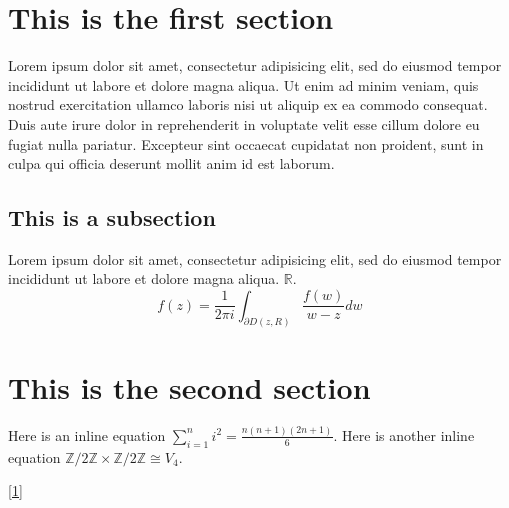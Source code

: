 \documentclass{article}
\newcommand{\Re}{\mathbb{R}}
\begin{document}
\section{This is the first section}

Lorem ipsum dolor sit amet, consectetur adipisicing elit, sed do eiusmod tempor incididunt ut labore et dolore magna aliqua. Ut enim ad minim veniam, quis nostrud exercitation ullamco laboris nisi ut aliquip ex ea commodo consequat. Duis aute irure dolor in reprehenderit in voluptate velit esse cillum dolore eu fugiat nulla pariatur. Excepteur sint occaecat cupidatat non proident, sunt in culpa qui officia deserunt mollit anim id est laborum.

\subsection{This is a subsection}

Lorem ipsum dolor sit amet, consectetur adipisicing elit, sed do eiusmod tempor incididunt ut labore et dolore magna aliqua. $\Re$.
\begin{equation}\tag{1}
  f(z) = \frac{1}{2\pi i} \int_{\partial D(z, R)} \frac{f(w)}{w-z} dw
\end{equation}

\section{This is the second section}

Here is an inline equation $\sum\limits_{i=1}^{n} i^2 = \frac{n(n+1)(2n+1)}{6}$.
Here is another inline equation $\mathbb{Z} / 2\mathbb{Z} \times \mathbb{Z} / 2\mathbb{Z} \cong V_{4}$.

\ref{1}
\end{document}
